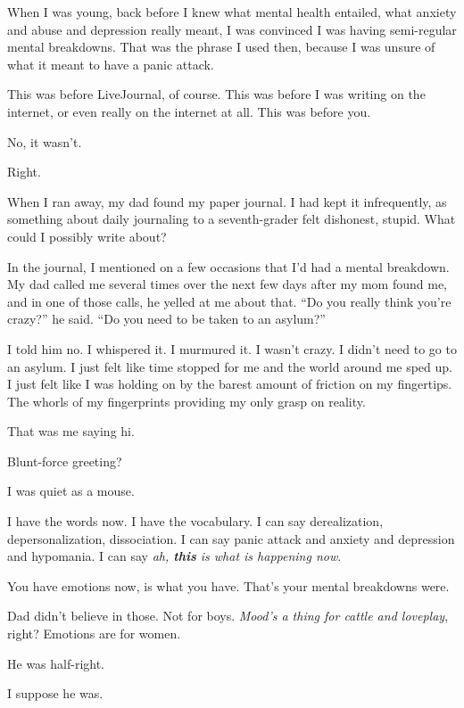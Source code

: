 \label{ally:6}
\begin{paracol}{2}
  \begin{leftcolumn}

\noindent When I was young, back before I knew what mental health entailed, what anxiety and abuse and depression really meant, I was convinced I was having semi-regular mental breakdowns. That was the phrase I used then, because I was unsure of what it meant to have a panic attack.

This was before LiveJournal, of course. This was before I was writing on the internet, or even really on the internet at all. This was before you.

\begin{ally}
No, it wasn't.
\end{ally}
Right.

When I ran away, my dad found my paper journal. I had kept it infrequently, as something about daily journaling to a seventh-grader felt dishonest, stupid. What could I possibly write about?

In the journal, I mentioned on a few occasions that I'd had a mental breakdown. My dad called me several times over the next few days after my mom found me, and in one of those calls, he yelled at me about that. ``Do you really think you're crazy?'' he said. ``Do you need to be taken to an asylum?''

I told him no. I whispered it. I murmured it. I wasn't crazy. I didn't need to go to an asylum. I just felt like time stopped for me and the world around me sped up. I just felt like I was holding on by the barest amount of friction on my fingertips. The whorls of my fingerprints providing my only grasp on reality.

\begin{ally}
That was me saying hi.
\end{ally}
Blunt-force greeting?

\begin{ally}
I was quiet as a mouse.
\end{ally}
I have the words now. I have the vocabulary. I can say derealization, depersonalization, dissociation. I can say panic attack and anxiety and depression and hypomania. I can say \emph{ah, \textbf{this} is what is happening now}.

\begin{ally}
You have emotions now, is what you have. That's your mental breakdowns were.
\end{ally}
Dad didn't believe in those. Not for boys. \emph{Mood's a thing for cattle and loveplay}, right? Emotions are for women.

\begin{ally}
He was half-right.
\end{ally}
I suppose he was.

\newpage
\end{leftcolumn}
\end{paracol}
